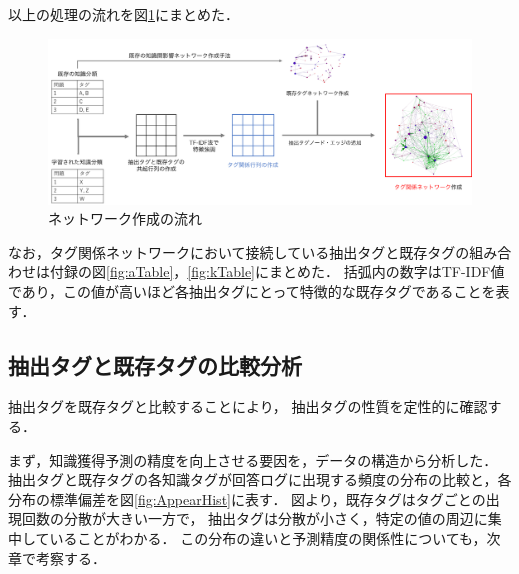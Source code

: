 以上の処理の流れを図\ref{fig:networkflow}にまとめた．

\begin{figure}[htb]
\begin{center}
\includegraphics[width=400pt]{./img/networkflow.png}
\end{center}
\caption{ネットワーク作成の流れ}
\label{fig:networkflow}
\end{figure}


なお，タグ関係ネットワークにおいて接続している抽出タグと既存タグの組み合わせは付録の図\ref{fig:aTable}，\ref{fig:kTable}にまとめた．
括弧内の数字はTF-IDF値であり，この値が高いほど各抽出タグにとって特徴的な既存タグであることを表す．




\subsection{抽出タグと既存タグの比較分析}
抽出タグを既存タグと比較することにより，
抽出タグの性質を定性的に確認する．



まず，知識獲得予測の精度を向上させる要因を，データの構造から分析した．
抽出タグと既存タグの各知識タグが回答ログに出現する頻度の分布の比較と，各分布の標準偏差を図\ref{fig:AppearHist}に表す．
図より，既存タグはタグごとの出現回数の分散が大きい一方で，
抽出タグは分散が小さく，特定の値の周辺に集中していることがわかる．
この分布の違いと予測精度の関係性についても，次章で考察する．


